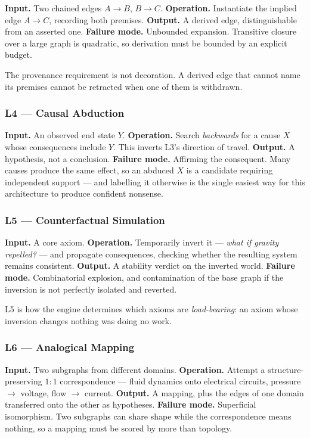 \documentclass[
  11pt,
  a4paper,
]{article}
\begin{document}
\textbf{Input.} Two chained edges \(A \to B\), \(B \to C\).
\textbf{Operation.} Instantiate the implied edge \(A \to C\), recording
both premises. \textbf{Output.} A derived edge, distinguishable from an
asserted one. \textbf{Failure mode.} Unbounded expansion. Transitive
closure over a large graph is quadratic, so derivation must be bounded
by an explicit budget.

The provenance requirement is not decoration. A derived edge that cannot
name its premises cannot be retracted when one of them is withdrawn.

\subsubsection{L4 --- Causal Abduction}\label{l4-causal-abduction}

\textbf{Input.} An observed end state \(Y\). \textbf{Operation.} Search
\emph{backwards} for a cause \(X\) whose consequences include \(Y\).
This inverts L3's direction of travel. \textbf{Output.} A hypothesis,
not a conclusion. \textbf{Failure mode.} Affirming the consequent. Many
causes produce the same effect, so an abduced \(X\) is a candidate
requiring independent support --- and labelling it otherwise is the
single easiest way for this architecture to produce confident nonsense.

\subsubsection{L5 --- Counterfactual
Simulation}\label{l5-counterfactual-simulation}

\textbf{Input.} A core axiom. \textbf{Operation.} Temporarily invert it
--- \emph{what if gravity repelled?} --- and propagate consequences,
checking whether the resulting system remains consistent.
\textbf{Output.} A stability verdict on the inverted world.
\textbf{Failure mode.} Combinatorial explosion, and contamination of the
base graph if the inversion is not perfectly isolated and reverted.

L5 is how the engine determines which axioms are \emph{load-bearing}: an
axiom whose inversion changes nothing was doing no work.

\subsubsection{L6 --- Analogical Mapping}\label{l6-analogical-mapping}

\textbf{Input.} Two subgraphs from different domains.
\textbf{Operation.} Attempt a structure-preserving \(1{:}1\)
correspondence --- fluid dynamics onto electrical circuits, pressure
\(\to\) voltage, flow \(\to\) current. \textbf{Output.} A mapping, plus
the edges of one domain transferred onto the other as hypotheses.
\textbf{Failure mode.} Superficial isomorphism. Two subgraphs can share
shape while the correspondence means nothing, so a mapping must be
scored by more than topology.
\end{document}
